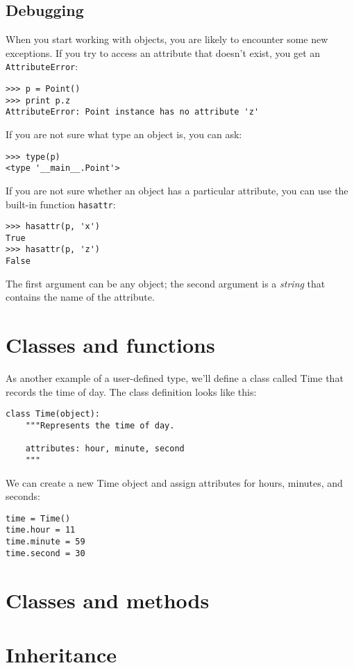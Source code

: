 \documentclass{article}
\begin{document}
\subsection{Debugging}
When you start working with objects, you are likely to encounter some new
exceptions. If you try to access an attribute that doesn’t exist, you get
an \verb|AttributeError|:
\begin{verbatim}
>>> p = Point()
>>> print p.z
AttributeError: Point instance has no attribute 'z'
\end{verbatim}
If you are not sure what type an object is, you can ask:
\begin{verbatim}
>>> type(p)
<type '__main__.Point'>
\end{verbatim}
If you are not sure whether an object has a particular attribute, you can
use the built-in function \verb|hasattr|:
\begin{verbatim}
>>> hasattr(p, 'x')
True
>>> hasattr(p, 'z')
False
\end{verbatim}
The first argument can be any object; the second argument is a
\emph{string} that contains the name of the attribute.
\newpage%
\section{Classes and functions}
As another example of a user-defined type, we’ll define a class called Time
that records the time of day. The class definition looks like this:
\begin{lstlisting}
class Time(object):
    """Represents the time of day.

    attributes: hour, minute, second
    """
\end{lstlisting}
We can create a new Time object and assign attributes for hours, minutes, and
seconds:
\begin{lstlisting}
time = Time()
time.hour = 11
time.minute = 59
time.second = 30
\end{lstlisting}


\newpage%
\section{Classes and methods}
\newpage%
\section{Inheritance}
\newpage%
\end{document}
